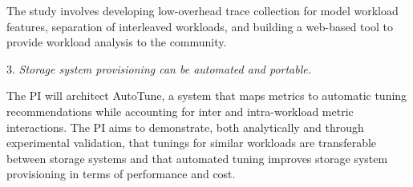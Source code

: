 \begin{myitemize}
The study involves developing low-overhead trace collection for model workload
features, separation of interleaved workloads, and building a web-based tool to
provide workload analysis to the community.




\item[3.]
\emph{Storage system provisioning can be automated and portable.}

The PI will architect AutoTune, a system that maps metrics to automatic tuning recommendations while accounting for inter and intra-workload metric interactions.  
The PI aims to
demonstrate, both analytically and through experimental validation, that tunings for similar workloads are transferable between storage
systems and that automated tuning improves storage system provisioning in terms of performance and cost.
  


\end{myitemize}
